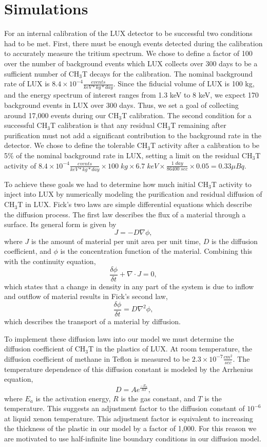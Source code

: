 \section{Simulations}

For an internal calibration of the LUX detector to be successful two conditions had to be met.  First, there must be enough events detected during the calibration to accurately measure the tritium spectrum.  We chose to define a factor of 100 over the number of  background events which LUX collects over 300 days to be a sufficient number of CH$_3$T decays for the calibration.  The nominal background rate of LUX is $8.4 \times 10^{-4} \frac{events}{keV*kg*day}$.  Since the fiducial volume of LUX is 100 kg, and the energy spectrum of interest ranges from 1.3 keV to 8 keV, we expect 170 background events in LUX over 300 days.  Thus, we set a goal of collecting around 17,000 events during our CH$_3$T calibration.  The second condition for a successful CH$_3$T calibration is that any residual CH$_3$T remaining after purification must not add a significant contribution to the background rate in the detector.  We chose to define the tolerable CH$_3$T activity after a calibration to be 5\% of the nominal background rate in LUX, setting a limit on the residual CH$_3$T activity of $8.4 \times 10^{-4} \frac{events}{keV*kg*day} \times 100 \; kg \times 6.7 \; keV \times \frac{1 \; day}{86400 \; sec} \times 0.05 = 0.33 \mu Bq$.

To achieve these goals we had to determine how much initial CH$_3$T activity to inject into LUX by numerically modeling the purification and residual diffusion of CH$_3$T in LUX.  Fick's two laws are simple differential equations which describe the diffusion process.  The first law describes the flux of a material through a surface.  Its general form is given by
\[J=-D \nabla \phi,\]
where $J$ is the amount of material per unit area per unit time, $D$ is the diffusion coefficient, and $\phi$ is the concentration function of the material. Combining this with the continuity equation,
\[\frac{\delta\phi}{\delta t} + \nabla \cdot J =0,\]
which states that a change in density in any part of the system is due to inflow and outflow of material results in Fick's second law,
\[\frac{\delta \phi}{\delta t} = D \nabla^2\phi,\]
which describes the transport of a material by diffusion.

To implement these diffusion laws into our model we must determine the diffusion coefficient of CH$_3$T in the plastics of LUX.  At room temperature, the diffusion coefficient of methane in Teflon is measured to be $2.3 \times 10^{-7} \frac{cm^2}{sec} $. \cite{Miyake}  The temperature dependence of this diffusion constant is modeled by the Arrhenius equation,
\[D=Ae^{\frac{-E_a}{RT}},\]
where $E_a$ is the activation energy, $R$ is the gas constant, and $T$ is the temperature.  This suggests an adjustment factor to the diffusion constant of $10^{-6}$ at liquid xenon temperature.  This adjustment factor is equivalent to increasing the thickness of the plastic in our model by a factor of 1,000.  For this reason we are motivated to use half-infinite line boundary conditions in our diffusion model.

